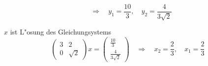 \begin{loesung}
\begin{teilaufgaben}
\[\quad
\Rightarrow
\quad
y_1=\frac{10}{3},\quad y_2=\frac{4}{3\sqrt{2}}
\]
\item $x$ ist L"osung des Gleichungsystems
\[
\begin{pmatrix}
3&2\\
0&\sqrt{2}
\end{pmatrix}x=\begin{pmatrix}
\frac{10}{3}\\
\frac{4}{3\sqrt{2}}
\end{pmatrix}
\quad\Rightarrow\quad
x_2=\frac23,\quad x_1=\frac23
\]
\end{teilaufgaben}
\end{loesung}

